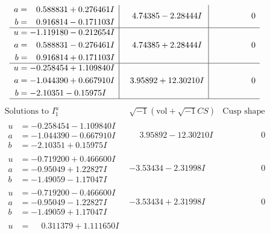 \documentclass[1p]{elsarticle_modified}
\theoremstyle{definition}
\newcommand{\I}{\sqrt{-1}}
\begin{document}
$$\begin{array}{c|c|c}
\begin{aligned}
a &= \phantom{-}0.588831 + 0.276461 I \\
b &= \phantom{-}0.916814 - 0.171103 I\end{aligned}
 & \phantom{-}4.74385 - 2.28444 I & \phantom{-0.000000 } 0 \\ \hline\begin{aligned}
u &= -1.119180 - 0.212654 I \\
a &= \phantom{-}0.588831 - 0.276461 I \\
b &= \phantom{-}0.916814 + 0.171103 I\end{aligned}
 & \phantom{-}4.74385 + 2.28444 I & \phantom{-0.000000 } 0 \\ \hline\begin{aligned}
u &= -0.258454 + 1.109840 I \\
a &= -1.044390 + 0.667910 I \\
b &= -2.10351 - 0.15975 I\end{aligned}
 & \phantom{-}3.95892 + 12.30210 I & \phantom{-0.000000 } 0\\
 \hline 
 \end{array}$$\newpage$$\begin{array}{c|c|c}  
\text{Solutions to }I^u_{1}& \I (\text{vol} + \sqrt{-1}CS) & \text{Cusp shape}\\
 \hline 
\begin{aligned}
u &= -0.258454 - 1.109840 I \\
a &= -1.044390 - 0.667910 I \\
b &= -2.10351 + 0.15975 I\end{aligned}
 & \phantom{-}3.95892 - 12.30210 I & \phantom{-0.000000 } 0 \\ \hline\begin{aligned}
u &= -0.719200 + 0.466600 I \\
a &= -0.95049 + 1.22827 I \\
b &= -1.49059 - 1.17047 I\end{aligned}
 & -3.53434 - 2.31998 I & \phantom{-0.000000 } 0 \\ \hline\begin{aligned}
u &= -0.719200 - 0.466600 I \\
a &= -0.95049 - 1.22827 I \\
b &= -1.49059 + 1.17047 I\end{aligned}
 & -3.53434 + 2.31998 I & \phantom{-0.000000 } 0 \\ \hline\begin{aligned}
u &= \phantom{-}0.311379 + 1.111650 I \\

\end{aligned}
\end{array}$$
\end{document}
